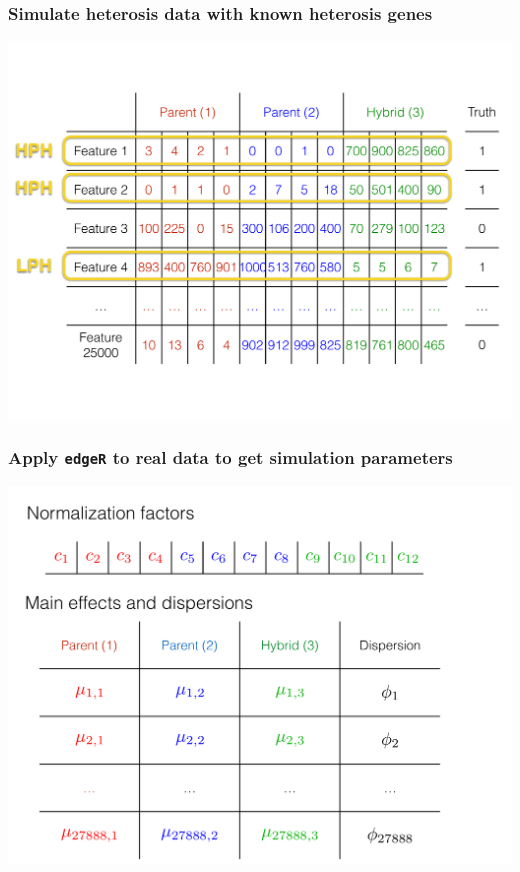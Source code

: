 \documentclass[handout]{beamer}
\numberwithin{equation}{section}
\begin{document}
\begin{frame}
\frametitle{Simulate heterosis data with known heterosis genes}
\begin{center}
\includegraphics[scale=.28]{data}
\end{center}
\end{frame}

\begin{frame}
\frametitle{Apply {\tt edgeR} to real data to get simulation parameters}
\begin{center}
\includegraphics[scale=.25]{parms}
\end{center}
\end{frame}
\end{document}
